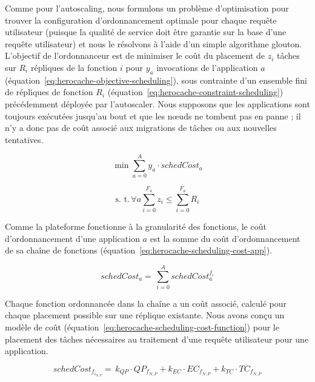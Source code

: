 Comme pour l'autoscaling, nous formulons un problème d'optimisation pour trouver la configuration d'ordonnancement optimale pour chaque requête utilisateur (puisque la qualité de service doit être garantie sur la base d'une requête utilisateur) et nous le résolvons à l'aide d'un simple algorithme glouton. L'objectif de l'ordonnanceur est de minimiser le coût du placement de $z_i$ tâches sur $R_i$ répliques de la fonction $i$ pour $y_a$ invocations de l'application $a$ (équation~\ref{eq:herocache-objective-scheduling}), sous contrainte d'un ensemble fini de répliques de fonction $R_{i}$ (équation~\ref{eq:herocache-constraint-scheduling}) précédemment déployée par l'autoscaler. Nous supposons que les applications sont toujours exécutées jusqu'au bout et que les nœuds ne tombent pas en panne ; il n'y a donc pas de coût associé aux migrations de tâches ou aux nouvelles tentatives.

\begin{equation}
    \min \sum_{a = 0}^{A} y_a \cdot schedCost_{a}
\label{eq:herocache-objective-scheduling}
\end{equation}

\begin{equation}
    \text{s. t.} \, \forall a \sum_{i = 0}^{F_a} z_i \leq \sum_{i = 0}^{F_a} R_{i}
\label{eq:herocache-constraint-scheduling}
\end{equation}

Comme la plateforme fonctionne à la granularité des fonctions, le coût d'ordonnancement d'une application $a$ est la somme du coût d'ordonnancement de sa chaîne de fonctions (équation~\ref{eq:herocache-scheduling-cost-app}).

\begin{equation}
    schedCost_{a} = \, \sum_{i = 0}^{A} schedCost^{{{f}_{i}}}_{a}
\label{eq:herocache-scheduling-cost-app}
\end{equation}

Chaque fonction ordonnancée dans la chaîne a un coût associé, calculé pour chaque placement possible sur une réplique existante. Nous avons conçu un modèle de coût (équation~\ref{eq:herocache-scheduling-cost-function}) pour le placement des tâches nécessaires au traitement d'une requête utilisateur pour une application.

\begin{equation}
    schedCost_{{f}_{{i}_{N, P}}} = \, k_{QP} \cdot QP_{{f}_{N, P}} + k_{EC} \cdot {EC}_{{f}_{N, P}} + k_{TC} \cdot TC_{{f}_{N, P}}
\label{eq:herocache-scheduling-cost-function}
\end{equation}

